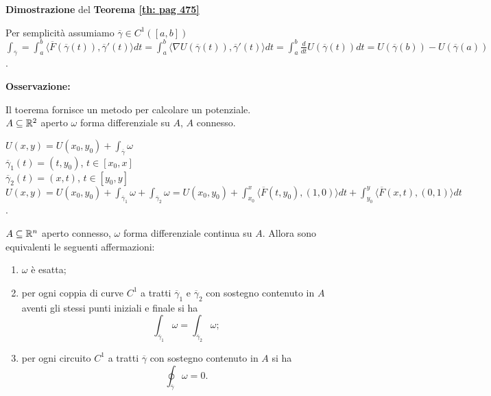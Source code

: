 \begin{dembar}
	\textbf{Dimostrazione} del \textbf{Teorema \ref{th: pag 475}}
	
	Per semplicità assumiamo $\overline{\gamma}\in C^1([a,b])$\\
	$\int_{\overline{\gamma}}=\int_a^b \langle \overline{F}(\overline{\gamma}(t)), \overline{\gamma}'(t) \rangle dt = \int_a^b \langle \nabla U(\overline{\gamma}(t)),\overline{\gamma}'(t) \rangle dt = \int_a^b \frac{d}{dt}U(\overline{\gamma}(t))dt=U(\overline{\gamma}(b))-U(\overline{\gamma}(a))$.
\end{dembar}
	

\textbf{Osservazione:}

Il toerema fornisce un metodo per calcolare un potenziale.\\
$A \subseteq \mathbb{R}^2$ aperto $\omega$ forma differenziale su $A$, $A$ connesso.\\

\segnaposto %

$U(x,y)=U(x_0,y_0)+\int_{\overline{\gamma}}\omega$\\
$\overline{\gamma}_1(t)=(t,y_0)$, $t \in [x_0,x]$\\
$\overline{\gamma}_2(t)=(x,t)$, $t \in [y_0,y]$\\
$U(x,y)=U(x_0,y_0)+\int_{\overline{\gamma}_1}\omega + \int_{\overline{\gamma}_2}\omega= U(x_0,y_0)+\int_{x_0}^x\langle \overline{F}(t,y_0),(1,0) \rangle dt + \int_{y_0}^y \langle \overline{F}(x,t),(0,1)\rangle dt$.


\begin{theorem}

	\label{th: pag 478}
	$A \subseteq \mathbb{R}^n$ aperto connesso, $\omega$ forma differenziale continua su $A$. Allora sono equivalenti le seguenti affermazioni:
	\begin{enumerate}
		\item $\omega$ è esatta;
		\item per ogni coppia di curve $C^1$ a tratti $\overline{\gamma}_1$ e $\overline{\gamma}_2$ con sostegno contenuto in $A$ aventi gli stessi punti iniziali e finale si ha
		\begin{equation*}
			\int_{\overline{\gamma}_1}\omega=\int_{\overline{\gamma}_2}\omega;
		\end{equation*}
		\item per ogni circuito $C^1$ a tratti $\overline{\gamma}$ con sostegno contenuto in $A$ si ha
		\begin{equation*}
			\oint_{\overline{\gamma}}\omega=0.
		\end{equation*}
	\end{enumerate}
\end{theorem}



